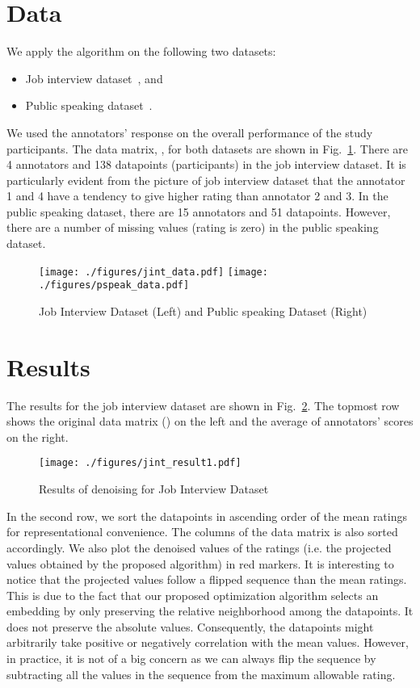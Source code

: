 \documentclass{article} \usepackage{nips14submit_e,times}
\begin{document}
\section{Data}
We apply the algorithm on the following two datasets:
\begin{itemize}
\item Job interview dataset~\cite{Hoque2013}, and
\item Public speaking dataset~\cite{Tanveer2015}.
\end{itemize}
We used the annotators' response on the overall performance of the study participants. The data matrix, , for both datasets are shown in Fig.~\ref{Fig:datasets}. There are 4 annotators and 138 datapoints (participants) in the job interview dataset. It is particularly evident from the picture of job interview dataset that the annotator 1 and 4 have a tendency to give higher rating than annotator 2 and 3.  In the public speaking dataset, there are 15 annotators and 51 datapoints. However, there are a number of missing values (rating is zero) in the public speaking dataset. 
\begin{figure}
\centering
\texttt{[image: ./figures/jint\_data.pdf]}
\texttt{[image: ./figures/pspeak\_data.pdf]}\caption{Job Interview Dataset (Left) and Public speaking Dataset (Right)}\label{Fig:datasets}
\end{figure}

\section{Results}
The results for the job interview dataset are shown in Fig.~\ref{Fig:jint_result}. The topmost row shows the original data matrix () on the left and the average of annotators' scores on the right.
\begin{figure}
\centering
\texttt{[image: ./figures/jint\_result1.pdf]}
\caption{Results of denoising for Job Interview Dataset}\label{Fig:jint_result}
\end{figure}

In the second row, we sort the datapoints in ascending order of the mean ratings for representational convenience. The columns of the data matrix is also sorted accordingly. We also plot the denoised values of the ratings (i.e. the projected values obtained by the proposed algorithm) in red markers. It is interesting to notice that the projected values follow a flipped sequence than the mean ratings. This is due to the fact that our proposed optimization algorithm selects an embedding by only preserving the relative neighborhood among the datapoints. It does not preserve the absolute values. Consequently, the datapoints might arbitrarily take positive or negatively correlation with the mean values. However, in practice, it is not of a big concern as we can always flip the sequence by subtracting all the values in the sequence from the maximum allowable rating.
\end{document}
